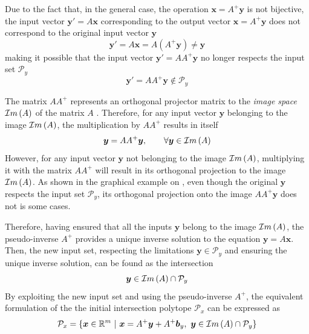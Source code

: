 Due to the fact that, in the general case, the operation $\bm{x}\!=\!A^+\bm{y}$ is not bijective, the input vector $\bm{y}'\!=\!A\bm{x}$ corresponding to the output vector $\bm{x}\!=\!A^+\bm{y}$ does not correspond to the original input vector $\bm{y}$ 
\begin{equation}
\bm{y}' = A\bm{x} = A(A^+\bm{y})\neq\bm{y}
\end{equation}
making it possible that the input vector ${\bm{y}'\!=\!AA^+\bm{y}}$ no longer respects the input set $\mathcal{P}_y$
\begin{equation}
    \bm{y}'=AA^+\bm{y}\notin\mathcal{P}_y
\end{equation}

The matrix $AA^+$ represents an orthogonal projector matrix to the \textit{image space} $\mathcal{I}m\left(A\right)$ of the matrix $A$ \cite[Chapter 5.5.4]{golub1996matrix}. Therefore, for any input vector $\bm{y}$ belonging to the image $\mathcal{I}m\left(A\right)$, the multiplication by $AA^+$ results in itself \cite[Chapeter 1.3.1]{wang2018generalized}
\begin{equation}
    \bm{y} = AA^+\bm{y}, \qquad \forall \bm{y}\in\mathcal{I}m\left(A\right)
    \label{eq:image_projector}
\end{equation}
However, for any input vector $\bm{y}$ not belonging to the image $\mathcal{I}m\left(A\right)$, multiplying it with the matrix $AA^+$ will result in its orthogonal projection to the image $\mathcal{I}m\left(A\right)$. As shown in the graphical example on , even though the original $\bm{y}$ respects the input set $\mathcal{P}_y$, its orthogonal projection onto the image $AA^+\bm{y}$ does not is some cases.

Therefore, having ensured that all the inputs $\bm{y}$ belong to the image $\mathcal{I}m\left(A\right)$, the pseudo-inverse $A^+$ provides a unique inverse solution to the equation $\bm{y} = A\bm{x}$. Then, the new input set, respecting the limitations $\bm{y}\in\mathcal{P}_y$ and ensuring the unique inverse solution, can be found as the intersection
\begin{equation}
   \bm{y} \in \mathcal{I}m\left(A\right) \cap \mathcal{P}_y
    \label{eq:intersection_ai}
\end{equation}
By exploiting the new input set and using the pseudo-inverse $A^+$, the equivalent formulation of the the initial intersection polytope $\mathcal{P}_x$ can be expressed as
\begin{equation}
\mathcal{P}_x=\{\bm{x}\in\mathbb{R}^m~|~ \bm{x} = A^+\bm{y} + A^+\bm{b}_y,~ \bm{y} \in \mathcal{I}m\left(A\right)\cap\mathcal{P}_y\} \label{eq:proj_inter}
\end{equation}

